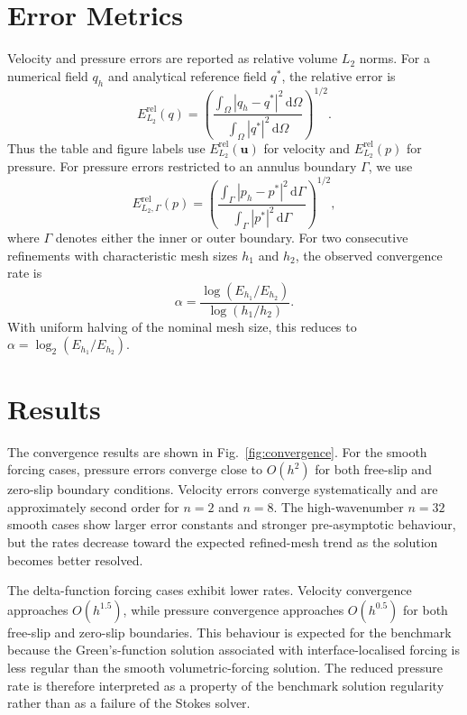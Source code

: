 \documentclass[gmd, manuscript]{copernicus}
\begin{document}
\section{Error Metrics}

Velocity and pressure errors are reported as relative volume \(L_2\) norms. For
a numerical field \(q_h\) and analytical reference field \(q^*\), the relative
error is
\begin{equation}
  E_{L_2}^{\mathrm{rel}}(q)
  =
  \left(
  \frac{\int_{\Omega}|q_h-q^*|^2\,\mathrm{d}\Omega}
       {\int_{\Omega}|q^*|^2\,\mathrm{d}\Omega}
  \right)^{1/2}.
\end{equation}
Thus the table and figure labels use \(E_{L_2}^{\mathrm{rel}}(\mathbf{u})\)
for velocity and \(E_{L_2}^{\mathrm{rel}}(p)\) for pressure.
For pressure errors restricted to an annulus boundary \(\Gamma\), we use
\begin{equation}
  E_{L_2,\Gamma}^{\mathrm{rel}}(p)
  =
  \left(
  \frac{\int_{\Gamma}|p_h-p^*|^2\,\mathrm{d}\Gamma}
       {\int_{\Gamma}|p^*|^2\,\mathrm{d}\Gamma}
  \right)^{1/2},
\end{equation}
where \(\Gamma\) denotes either the inner or outer boundary.
For two consecutive refinements with characteristic mesh sizes \(h_1\) and
\(h_2\), the observed convergence rate is
\begin{equation}
  \alpha
  =
  \frac{\log(E_{h_1}/E_{h_2})}{\log(h_1/h_2)}.
\end{equation}
With uniform halving of the nominal mesh size, this reduces to
\(\alpha=\log_2(E_{h_1}/E_{h_2})\).

\section{Results}

The convergence results are shown in Fig.~\ref{fig:convergence}. For the smooth
forcing cases, pressure errors converge close to \(O(h^2)\) for both free-slip
and zero-slip boundary conditions. Velocity errors converge systematically and
are approximately second order for \(n=2\) and \(n=8\). The high-wavenumber
\(n=32\) smooth cases show larger error constants and stronger pre-asymptotic
behaviour, but the rates decrease toward the expected refined-mesh trend as the
solution becomes better resolved.

The delta-function forcing cases exhibit lower rates. Velocity convergence
approaches \(O(h^{1.5})\), while pressure convergence approaches \(O(h^{0.5})\)
for both free-slip and zero-slip boundaries. This behaviour is expected for the
 benchmark because the Green's-function solution associated with
interface-localised forcing is less regular than the smooth volumetric-forcing
solution. The reduced pressure rate is therefore interpreted
as a property of the benchmark solution regularity rather than as a failure of
the Stokes solver.
\end{document}

